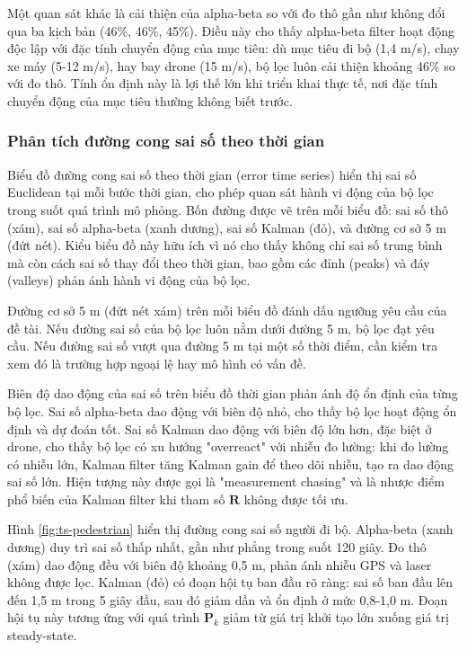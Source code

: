 Một quan sát khác là cải thiện của alpha-beta so với đo thô gần như không đổi qua ba kịch bản (46\%, 46\%, 45\%). Điều này cho thấy alpha-beta filter hoạt động độc lập với đặc tính chuyển động của mục tiêu: dù mục tiêu đi bộ (1,4 m/s), chạy xe máy (5-12 m/s), hay bay drone (15 m/s), bộ lọc luôn cải thiện khoảng 46\% so với đo thô. Tính ổn định này là lợi thế lớn khi triển khai thực tế, nơi đặc tính chuyển động của mục tiêu thường không biết trước.

\subsubsection{Phân tích đường cong sai số theo thời gian}

\hspace{0.5cm} Biểu đồ đường cong sai số theo thời gian (error time series) hiển thị sai số Euclidean tại mỗi bước thời gian, cho phép quan sát hành vi động của bộ lọc trong suốt quá trình mô phỏng. Bốn đường được vẽ trên mỗi biểu đồ: sai số thô (xám), sai số alpha-beta (xanh dương), sai số Kalman (đỏ), và đường cơ sở 5 m (đứt nét). Kiểu biểu đồ này hữu ích vì nó cho thấy không chỉ sai số trung bình mà còn cách sai số thay đổi theo thời gian, bao gồm các đỉnh (peaks) và đáy (valleys) phản ánh hành vi động của bộ lọc.

Đường cơ sở 5 m (đứt nét xám) trên mỗi biểu đồ đánh dấu ngưỡng yêu cầu của đề tài. Nếu đường sai số của bộ lọc luôn nằm dưới đường 5 m, bộ lọc đạt yêu cầu. Nếu đường sai số vượt qua đường 5 m tại một số thời điểm, cần kiểm tra xem đó là trường hợp ngoại lệ hay mô hình có vấn đề.

Biên độ dao động của sai số trên biểu đồ thời gian phản ánh độ ổn định của từng bộ lọc. Sai số alpha-beta dao động với biên độ nhỏ, cho thấy bộ lọc hoạt động ổn định và dự đoán tốt. Sai số Kalman dao động với biên độ lớn hơn, đặc biệt ở drone, cho thấy bộ lọc có xu hướng "overreact" với nhiễu đo lường: khi đo lường có nhiễu lớn, Kalman filter tăng Kalman gain để theo dõi nhiễu, tạo ra dao động sai số lớn. Hiện tượng này được gọi là "measurement chasing" và là nhược điểm phổ biến của Kalman filter khi tham số $\mathbf{R}$ không được tối ưu.

Hình \ref{fig:ts-pedestrian} hiển thị đường cong sai số người đi bộ. Alpha-beta (xanh dương) duy trì sai số thấp nhất, gần như phẳng trong suốt 120 giây. Đo thô (xám) dao động đều với biên độ khoảng 0,5 m, phản ánh nhiễu GPS và laser không được lọc. Kalman (đỏ) có đoạn hội tụ ban đầu rõ ràng: sai số ban đầu lên đến 1,5 m trong 5 giây đầu, sau đó giảm dần và ổn định ở mức 0,8-1,0 m. Đoạn hội tụ này tương ứng với quá trình $\mathbf{P}_k$ giảm từ giá trị khởi tạo lớn xuống giá trị steady-state.

